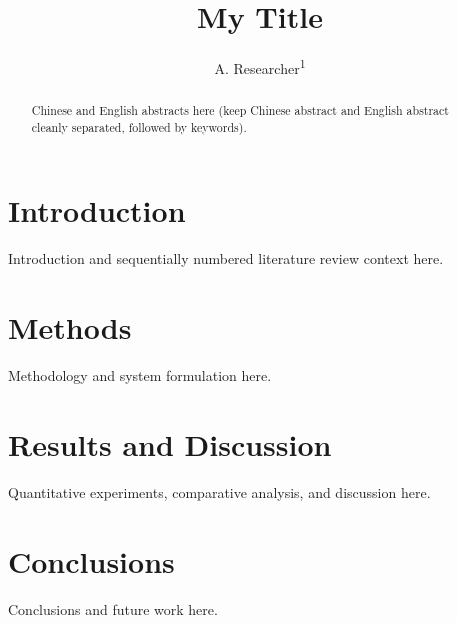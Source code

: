 \documentclass[11pt,a4paper]{article}
\title{My Title}
\author{A. Researcher\textsuperscript{1}}
\date{}
\begin{document}
\maketitle

\begin{abstract}
Chinese and English abstracts here (keep Chinese abstract and English abstract cleanly separated, followed by keywords).
\end{abstract}

\newpage

\section{Introduction}
Introduction and sequentially numbered literature review context here.

\section{Methods}
Methodology and system formulation here.

\section{Results and Discussion}
Quantitative experiments, comparative analysis, and discussion here.

\section{Conclusions}
Conclusions and future work here.



\end{document}
